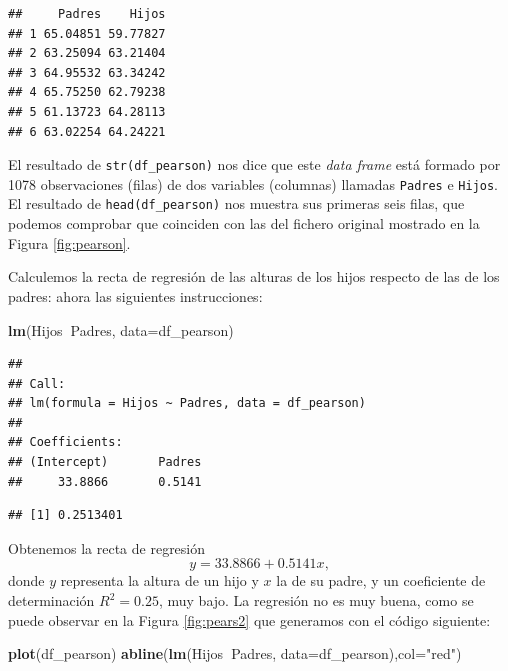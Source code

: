 \documentclass[]{book}
\newenvironment{Shaded}{\begin{snugshade}}{\end{snugshade}}
\newcommand{\DataTypeTok}[1]{\textcolor[rgb]{0.13,0.29,0.53}{#1}}
\newcommand{\KeywordTok}[1]{\textcolor[rgb]{0.13,0.29,0.53}{\textbf{#1}}}
\newcommand{\NormalTok}[1]{#1}
\newcommand{\OperatorTok}[1]{\textcolor[rgb]{0.81,0.36,0.00}{\textbf{#1}}}
\newcommand{\StringTok}[1]{\textcolor[rgb]{0.31,0.60,0.02}{#1}}
\theoremstyle{definition}
\theoremstyle{definition}
\theoremstyle{definition}
\theoremstyle{remark}
\begin{document}
\begin{verbatim}
##     Padres    Hijos
## 1 65.04851 59.77827
## 2 63.25094 63.21404
## 3 64.95532 63.34242
## 4 65.75250 62.79238
## 5 61.13723 64.28113
## 6 63.02254 64.24221
\end{verbatim}

El resultado de \texttt{str(df\_pearson)} nos dice que este \emph{data frame} está formado por 1078 observaciones (filas) de dos variables (columnas) llamadas \texttt{Padres} e \texttt{Hijos}. El resultado de \texttt{head(df\_pearson)} nos muestra sus primeras seis filas, que podemos comprobar que coinciden con las del fichero original mostrado en la Figura \ref{fig:pearson}.

Calculemos la recta de regresión de las alturas de los hijos respecto de las de los padres: ahora las siguientes instrucciones:

\begin{Shaded}
\begin{Highlighting}[]
\KeywordTok{lm}\NormalTok{(Hijos}\OperatorTok{~}\NormalTok{Padres, }\DataTypeTok{data=}\NormalTok{df_pearson)}
\end{Highlighting}
\end{Shaded}

\begin{verbatim}
## 
## Call:
## lm(formula = Hijos ~ Padres, data = df_pearson)
## 
## Coefficients:
## (Intercept)       Padres  
##     33.8866       0.5141
\end{verbatim}

\begin{Shaded}
\end{Shaded}

\begin{verbatim}
## [1] 0.2513401
\end{verbatim}

Obtenemos la recta de regresión
\[
y=33.8866+0.5141x,
\]
donde \(y\) representa la altura de un hijo y \(x\) la de su padre, y un coeficiente de determinación \(R^2=0.25\),
muy bajo. La regresión no es muy buena, como se puede observar en la Figura \ref{fig:pears2} que generamos con el código siguiente:

\begin{Shaded}
\begin{Highlighting}[]
\KeywordTok{plot}\NormalTok{(df_pearson)}
\KeywordTok{abline}\NormalTok{(}\KeywordTok{lm}\NormalTok{(Hijos}\OperatorTok{~}\NormalTok{Padres, }\DataTypeTok{data=}\NormalTok{df_pearson),}\DataTypeTok{col=}\StringTok{"red"}\NormalTok{)}
\end{Highlighting}
\end{Shaded}
\end{document}
